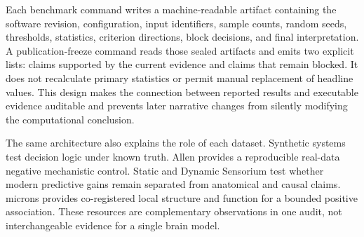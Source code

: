 Each benchmark command writes a machine-readable artifact containing the
software revision, configuration, input identifiers, sample counts, random
seeds, thresholds, statistics, criterion directions, block decisions, and final
interpretation. A publication-freeze command reads those sealed artifacts and
emits two explicit lists: claims supported by the current evidence and claims
that remain blocked. It does not recalculate primary statistics or permit
manual replacement of headline values. This design makes the connection between
reported results and executable evidence auditable and prevents later narrative
changes from silently modifying the computational conclusion.

The same architecture also explains the role of each dataset. Synthetic systems
test decision logic under known truth. Allen provides a reproducible real-data
negative mechanistic control. Static and Dynamic Sensorium test whether modern
predictive gains remain separated from anatomical and causal claims. \acs{microns}
provides co-registered local structure and function for a bounded positive
association. These resources are complementary observations in one audit, not
interchangeable evidence for a single brain model.
